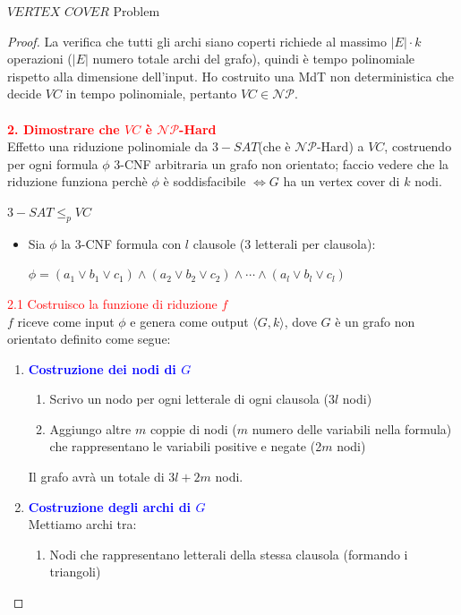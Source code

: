 \documentclass{article}  %
\theoremstyle{definition}
\begin{document}
\begin{theorem}{$VERTEX$ $COVER$ Problem}
\begin{proof}
		La verifica che tutti gli archi siano coperti richiede al massimo $|E| \cdot k$ operazioni ($|E|$ numero totale archi del grafo), quindi è tempo polinomiale rispetto alla dimensione dell'input.
		Ho costruito una MdT non deterministica che decide $VC$ in tempo polinomiale, pertanto $VC \in \mathcal{NP}$. \\ \\
		\textcolor{red}{\textbf{2. Dimostrare che $VC$ è $\mathcal{NP}$-Hard}} \\
		Effetto una riduzione polinomiale da $3-SAT$(che è $\mathcal{NP}$-Hard) a $VC$, costruendo per ogni formula $\phi$ 3-CNF arbitraria un grafo non orientato; faccio
		vedere che la riduzione funziona perchè $\phi$ è soddisfacibile $\iff G$ ha un vertex cover di $k$ nodi.
		\begin{center}
			$3-SAT \leq_p VC$
		\end{center}
		\begin{itemize}
			\item Sia $\phi$ la 3-CNF formula con $l$ clausole (3 letterali per clausola):
			      \begin{center}
				      $\phi = (a_1 \lor b_1 \lor c_1) \land (a_2 \lor b_2 \lor c_2) \land \cdots \land (a_l \lor b_l \lor c_l)$
			      \end{center}
		\end{itemize}
		\textcolor{red}{2.1 Costruisco la funzione di riduzione $f$} \\
		$f$ riceve come input $\phi$ e genera come output $\langle G,k \rangle$, dove $G$ è un grafo non orientato definito come segue:
		\begin{enumerate}
			\item \textcolor{blue}{\textbf{Costruzione dei nodi di $G$}}
			      \begin{enumerate}
				      \item Scrivo un nodo per ogni letterale di ogni clausola (3$l$ nodi)
				      \item Aggiungo altre $m$ coppie di nodi ($m$ numero delle variabili nella formula) che rappresentano le variabili positive e negate (2$m$ nodi)
			      \end{enumerate}
			      Il grafo avrà un totale di $3l+2m$ nodi.
			\item \textcolor{blue}{\textbf{Costruzione degli archi di $G$}} \\
			      Mettiamo archi tra:
			      \begin{enumerate}
				      \item Nodi che rappresentano letterali della stessa clausola (formando i triangoli)

\end{enumerate}
\end{enumerate}
\end{proof}
\end{theorem}
\end{document}
